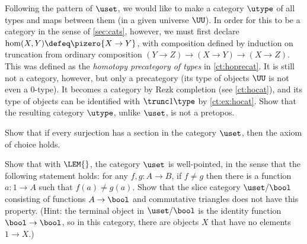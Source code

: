 \sectionExercises

\begin{ex}\label{ex:utype-ct}
  Following the pattern of $\uset$, we would like to make a category $\utype$ of all types and maps between them (in a given universe $\UU$).  In order for this to be a category in the sense of \cref{sec:cats}, however, we must first declare $\hom(X,Y) \defeq \pizero{X\to Y}$, with composition defined by induction on truncation from ordinary composition $(Y\to Z) \to (X\to Y) \to (X\to Z)$.  This was defined as the \emph{homotopy precategory of types} in \cref{ct:hoprecat}.  It is still not a category, however, but only a precategory (its type of objects $\UU$ is not even a $0$-type).  It becomes a category by Rezk completion
  (see \cref{ct:hocat}), and its type of objects can be identified with $\trunc1\type$ by \cref{ct:ex:hocat}.  Show that the resulting category $\utype$, unlike $\uset$, is not a pretopos.
\end{ex}

\begin{ex}\label{ex:surjections-have-sections-impl-ac}
  Show that if every surjection has a section in the category $\uset$, then the axiom of choice holds.
\end{ex}

\begin{ex}\label{ex:well-pointed}
  Show that with $\LEM{}$, the category $\uset$ is well-pointed,
  in the sense that the following statement holds: for any $f, g : A\to B$, if $f \neq g$ then there is a function $a : 1\to A$ such that $f(a) \neq g(a)$.
  Show that the slice category
  $\uset/\bool$ consisting of functions $A\to \bool$ and commutative triangles does not have this property.
  (Hint: the terminal object in $\uset/\bool$ is the identity function $\bool \to \bool$, so in this category, there are objects $X$ that have no elements $1\to X$.)
\end{ex}

